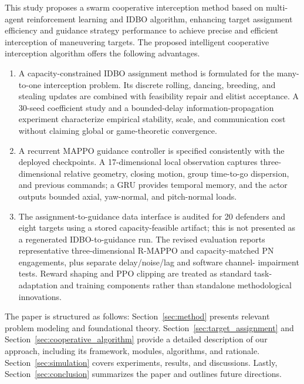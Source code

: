 \documentclass[lettersize,journal]{IEEEtran}
\begin{document}
This study proposes a swarm cooperative interception method based on multi-agent reinforcement
learning and IDBO algorithm, enhancing target assignment efficiency and guidance strategy
performance to achieve precise and efficient interception of maneuvering targets.
The proposed intelligent cooperative interception algorithm offers the following advantages.

\begin{enumerate}
\item A capacity-constrained IDBO assignment method is formulated for the many-to-one
interception problem. Its discrete rolling, dancing, breeding, and stealing updates are
combined with feasibility repair and elitist acceptance. A 30-seed coefficient study and a
bounded-delay information-propagation experiment characterize empirical stability, scale, and
communication cost without claiming global or game-theoretic convergence.

\item A recurrent MAPPO guidance controller is specified consistently with the deployed
checkpoints. A 17-dimensional local observation captures three-dimensional relative geometry,
closing motion, group time-to-go dispersion, and previous commands; a GRU provides temporal
memory, and the actor outputs bounded axial, yaw-normal, and pitch-normal loads.

\item The assignment-to-guidance data interface is audited for 20 defenders and eight
targets using a stored capacity-feasible artifact; this is not presented as a regenerated
IDBO-to-guidance run. The revised evaluation reports representative three-dimensional R-MAPPO and
capacity-matched PN engagements, plus separate delay/noise/lag and software channel-
impairment tests. Reward shaping and PPO clipping are treated as standard task-adaptation and
training components rather than standalone methodological innovations.
\end{enumerate}

The paper is structured as follows: Section~\ref{sec:method} presents relevant problem modeling and foundational theory. Section~\ref{sec:target_assignment} and Section~\ref{sec:cooperative_algorithm} provide a detailed description of our approach, including its framework, modules, algorithms, and rationale. Section~\ref{sec:simulation} covers experiments, results, and discussions. Lastly, Section~\ref{sec:conclusion} summarizes the paper and outlines future directions.

\end{document}
